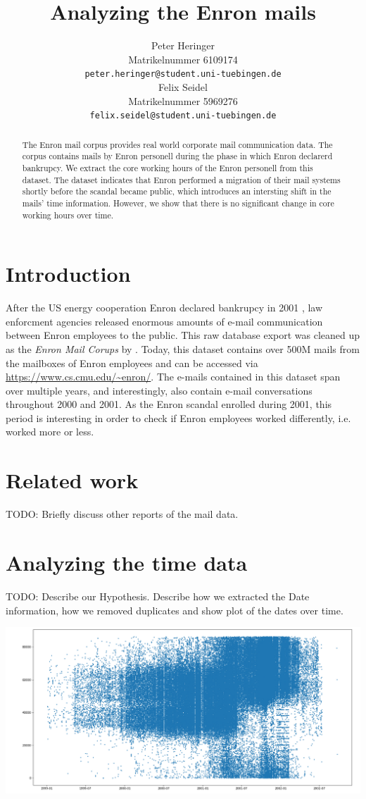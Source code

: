 \documentclass{article}
\title{Analyzing the Enron mails}
\author{%
  Peter Heringer\\
  Matrikelnummer 6109174 \\
  \texttt{peter.heringer@student.uni-tuebingen.de} \\
  \And
  Felix Seidel\\
  Matrikelnummer 5969276 \\
  \texttt{felix.seidel@student.uni-tuebingen.de} \\
}
\begin{document}
\maketitle

\begin{abstract}
  The Enron mail corpus provides real world corporate mail communication data. 
  The corpus contains mails by Enron personell during the phase in which Enron 
  declarerd bankrupcy. We extract the core working hours of the Enron personell 
  from this dataset. The dataset indicates that Enron performed a migration 
  of their mail systems shortly before the scandal became public, which
  introduces an intersting shift in the mails' time information. However, we
  show that there is no significant change in core working hours over time.
\end{abstract}

\section{Introduction}
After the US energy cooperation Enron declared bankrupcy in 2001
\citep{10.1257/089533003765888403}, law enforcment agencies released enormous
amounts of e-mail communication between Enron employees to the public. This raw
database export was cleaned up as the \emph{Enron Mail Corups} by
\citet{Klimt2004IntroducingTE}. Today, this dataset contains over 500M mails
from the mailboxes of Enron employees and can be accessed via
\url{https://www.cs.cmu.edu/~enron/}. The e-mails contained in this dataset span
over multiple years, and interestingly, also contain e-mail conversations
throughout 2000 and 2001. As the Enron scandal enrolled during 2001, this period
is interesting in order to check if Enron employees worked differently, i.e.
worked more or less.


\section{Related work}
TODO: Briefly discuss other reports of the mail data.

\section{Analyzing the time data}
TODO: Describe our Hypothesis. Describe how we extracted the Date information, 
how we removed duplicates and show plot of the dates over time.

\begin{center}
  \includegraphics[width=0.7\linewidth]{tmp/plot_all_mail.png}
\end{center}
\end{document}
